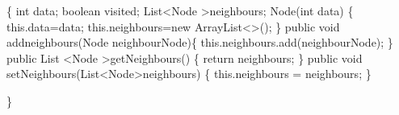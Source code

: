 \documentclass{report}
\begin{document}
	\{\newline
		\hspace*{1cm} int data;\newline
		\hspace*{1cm}boolean visited;\newline
		\hspace*{1cm}List\textless Node \textgreater neighbours;\newline
 \newline
		\hspace*{1cm}Node(int data)\newline
		\hspace*{1cm}\{\newline
			\hspace*{1.5cm}this.data=data;\newline
			\hspace*{1.5cm}this.neighbours=new ArrayList\textless \textgreater();\newline
		\hspace*{1cm}\}\newline
		\hspace*{1cm}public void addneighbours(Node neighbourNode)\{\newline
			\hspace*{1,5cm}this.neighbours.add(neighbourNode);\newline
		\hspace*{1cm}\}\newline
		\hspace*{1cm}public List \textless Node \textgreater getNeighbours() \{\newline
			\hspace*{1,5cm}return neighbours;\newline
		\hspace*{1cm}\}\newline
		\hspace*{1cm}public void setNeighbours(List\textless Node\textgreater neighbours) \{\newline
			\hspace*{1,5cm}this.neighbours = neighbours;\newline
		\hspace*{1cm}\}
        
        \}
\newline        
 
\end{document}
